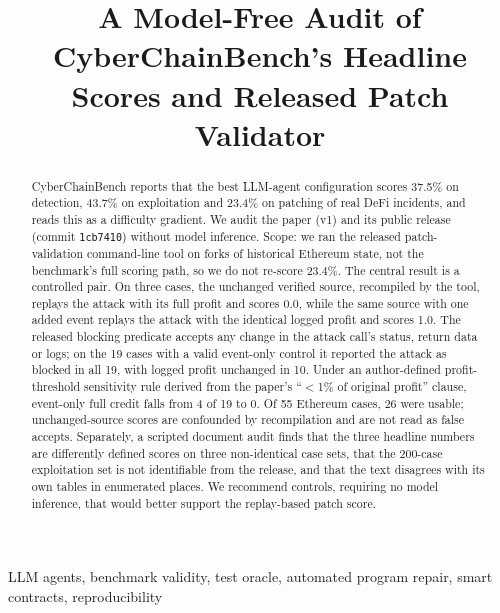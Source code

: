 \documentclass[conference]{IEEEtran}
\newcommand{\code}[1]{\texttt{#1}}
\begin{document}
\sloppy

\title{A Model-Free Audit of CyberChainBench's Headline Scores and Released Patch Validator}

\author{
}

\maketitle

\begin{abstract}
CyberChainBench reports that the best LLM-agent configuration scores 37.5\% on detection, 43.7\% on exploitation and 23.4\% on patching of real DeFi incidents, and reads this as a difficulty gradient. We audit the paper (v1) and its public release (commit \code{1cb7410}) without model inference. Scope: we ran the released patch-validation command-line tool on forks of historical Ethereum state, not the benchmark's full scoring path, so we do not re-score 23.4\%. The central result is a controlled pair. On three cases, the unchanged verified source, recompiled by the tool, replays the attack with its full profit and scores 0.0, while the same source with one added event replays the attack with the identical logged profit and scores 1.0. The released blocking predicate accepts any change in the attack call's status, return data or logs; on the 19 cases with a valid event-only control it reported the attack as blocked in all 19, with logged profit unchanged in 10. Under an author-defined profit-threshold sensitivity rule derived from the paper's ``$<$1\% of original profit'' clause, event-only full credit falls from 4 of 19 to 0. Of 55 Ethereum cases, 26 were usable; unchanged-source scores are confounded by recompilation and are not read as false accepts. Separately, a scripted document audit finds that the three headline numbers are differently defined scores on three non-identical case sets, that the 200-case exploitation set is not identifiable from the release, and that the text disagrees with its own tables in enumerated places. We recommend controls, requiring no model inference, that would better support the replay-based patch score.
\end{abstract}

\begin{IEEEkeywords}
LLM agents, benchmark validity, test oracle, automated program repair, smart contracts, reproducibility
\end{IEEEkeywords}
\end{document}
